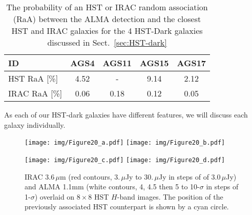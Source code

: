 \documentclass[longauth]{aa}
\begin{document}
\begin{table}
\centering          
\begin{tabular}{l c c c c}  
\hline
ID&AGS4&AGS11&AGS15&AGS17\\
\hline    
\hline    

HST RaA [\%]& 4.52 & -  & 9.14 & 2.12 \\
IRAC RaA [\%]& 0.06  & 0.18 & 0.12 & 0.05 \\
\hline 
\end{tabular}
\caption{The probability of an HST or IRAC random association (RaA) between the ALMA detection and the closest HST and IRAC galaxies for the 4 HST-Dark galaxies discussed in Sect.~\ref{sec:HST-dark}}
\label{Hasardious_Association}  
\end{table}

As each of our HST-dark galaxies have different features, we will discuss each galaxy individually.

\begin{figure*}
\centering
\begin{minipage}[t]{0.85\textwidth}
\resizebox{\hsize}{!} { 
\texttt{[image: img/Figure20\_a.pdf]} 
\texttt{[image: img/Figure20\_b.pdf]} 
}
\end{minipage}
\begin{minipage}[t]{0.85\textwidth}
\resizebox{\hsize}{!} { 
\texttt{[image: img/Figure20\_c.pdf]} 
\texttt{[image: img/Figure20\_d.pdf]} 

}
\end{minipage}
      \caption{IRAC 3.6\,$\mu$m (red contours, 3.\,$\mu$Jy to 30.\,$\mu$Jy in steps of of 3.0\,$\mu$Jy) and ALMA 1.1mm (white contours, 4, 4.5 then 5 to 10-$\sigma$ in steps of 1-$\sigma$) overlaid on 8\,$\times$\,8 HST $H$-band images. The position of the previously associated HST counterpart is shown by a cyan circle.}
         \label{IRAC_countours}
\end{figure*}
\end{document}
